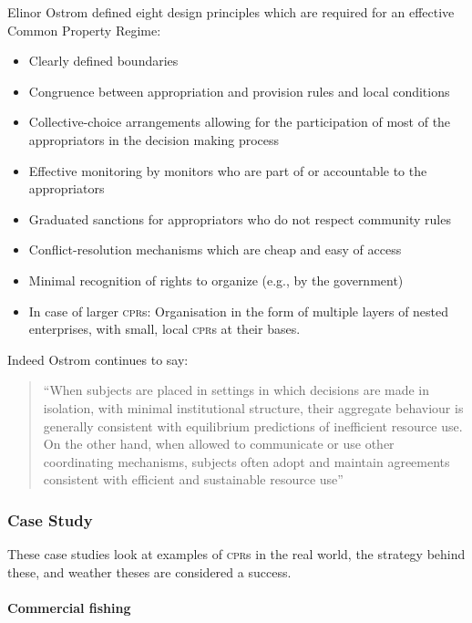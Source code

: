 Elinor Ostrom defined eight design principles which are required for an effective Common Property Regime:~\cite{Ostrom-90}

\begin{itemize}
	\item Clearly defined boundaries
	\item Congruence between appropriation and provision rules and local conditions
	\item Collective-choice arrangements allowing for the participation of most of the appropriators in the decision making process
	\item Effective monitoring by monitors who are part of or accountable to the appropriators
	\item Graduated sanctions for appropriators who do not respect community rules
	\item Conflict-resolution mechanisms which are cheap and easy of access
	\item Minimal recognition of rights to organize (e.g., by the government)
	\item In case of larger \textsc{cpr}s: Organisation in the form of multiple layers of nested enterprises, with small, local \textsc{cpr}s at their bases.
\end{itemize}

Indeed Ostrom continues to say:

\begin{quote}
	``When subjects are placed in settings in which decisions are made in isolation, with minimal institutional structure, their aggregate behaviour is generally consistent with equilibrium predictions of inefficient resource use. On the other hand, when allowed to communicate or use other coordinating mechanisms, subjects often adopt and maintain agreements consistent with efficient and sustainable resource use''~\cite{Ostrom-rules}
\end{quote}

\subsubsection{Case Study}

These case studies look at examples of \textsc{cpr}s in the real world, the strategy behind these, and weather theses are considered a success.

\paragraph{Commercial fishing}

